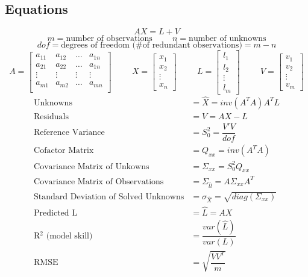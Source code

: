 \subsection{Equations}
\[
AX=L+V 
\]
\[
m = \text{number of observations} \hspace{1cm} 
n = \text{number of unknowns}
\]
\[
dof = \text{degrees of freedom (\# of redundant observations)} = m-n
\]
\[
A = \begin{bmatrix}
a_{11} & a_{12} & \dots & a_{1n} \\
a_{21} & a_{22} & \dots & a_{1n} \\
\vdots & \vdots & \vdots& \vdots \\
a_{m1} & a_{m2} & \dots & a_{mn} \\
\end{bmatrix}
\hspace{1cm}
X = 
\begin{bmatrix}
x_1 \\ x_2 \\ \vdots \\ x_n
\end{bmatrix}
\hspace{1cm}
L = 
\begin{bmatrix}
l_1 \\ l_2 \\ \vdots \\ l_m
\end{bmatrix}
\hspace{1cm}
V = 
\begin{bmatrix}
v_1 \\ v_2 \\ \vdots \\ v_m
\end{bmatrix}
\]
\begin{align*}
\text{Unknowns} &= \hat{X} = inv(A^TA)A^TL\\
\text{Residuals} &= V = AX - L\\
\text{Reference Variance} &= S_0^2 = \dfrac{V'V}{dof} \\
\text{Cofactor Matrix} &= Q_{xx} = inv(A^TA) \\
\text{Covariance Matrix of Unkowns} &= \Sigma_{xx} = S_0^2 Q_{xx} \\
\text{Covariance Matrix of Observations} &= \Sigma_{\hat{l}\hat{l}} = A \Sigma_{xx} A^T \\
\text{Standard Deviation of Solved Unknowns} &= \sigma_{\hat{X}} = \sqrt{diag(\Sigma_{xx})} \\
\text{Predicted L} &= \hat{L} = AX \\
\text{R$^2$ (model skill)} &= \dfrac{var(\hat{L})}{var(L)} \\
\text{RMSE } &= \sqrt{\dfrac{VV^T}{m}} \\
\end{align*}
\clearpage
